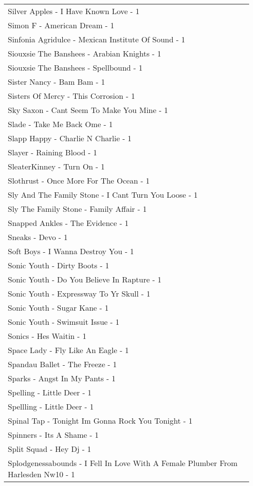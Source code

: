 \documentclass[
]{article}
\begin{document}
\begin{longtable}{l}
Silver Apples - I Have Known Love - 1 \\ 
Simon F - American Dream - 1 \\ 
Sinfonia Agridulce - Mexican Institute Of Sound - 1 \\ 
Siouxsie The Banshees - Arabian Knights - 1 \\ 
Siouxsie The Banshees - Spellbound - 1 \\ 
Sister Nancy - Bam Bam - 1 \\ 
Sisters Of Mercy - This Corrosion - 1 \\ 
Sky Saxon - Cant Seem To Make You Mine - 1 \\ 
Slade - Take Me Back Ome - 1 \\ 
Slapp Happy - Charlie N Charlie - 1 \\ 
Slayer - Raining Blood - 1 \\ 
SleaterKinney - Turn On - 1 \\ 
Slothrust - Once More For The Ocean - 1 \\ 
Sly And The Family Stone - I Cant Turn You Loose - 1 \\ 
Sly The Family Stone - Family Affair - 1 \\ 
Snapped Ankles - The Evidence - 1 \\ 
Sneaks - Devo - 1 \\ 
Soft Boys - I Wanna Destroy You - 1 \\ 
Sonic Youth - Dirty Boots - 1 \\ 
Sonic Youth - Do You Believe In Rapture - 1 \\ 
Sonic Youth - Expressway To Yr Skull - 1 \\ 
Sonic Youth - Sugar Kane - 1 \\ 
Sonic Youth - Swimsuit Issue - 1 \\ 
Sonics - Hes Waitin - 1 \\ 
Space Lady - Fly Like An Eagle - 1 \\ 
Spandau Ballet - The Freeze - 1 \\ 
Sparks - Angst In My Pants - 1 \\ 
Spelling - Little Deer - 1 \\ 
Spellling - Little Deer - 1 \\ 
Spinal Tap - Tonight Im Gonna Rock You Tonight - 1 \\ 
Spinners - Its A Shame - 1 \\ 
Split Squad - Hey Dj - 1 \\ 
Splodgenessabounds - I Fell In Love With A Female Plumber From Harlesden Nw10 - 1 \\ 

\end{longtable}
\end{document}
